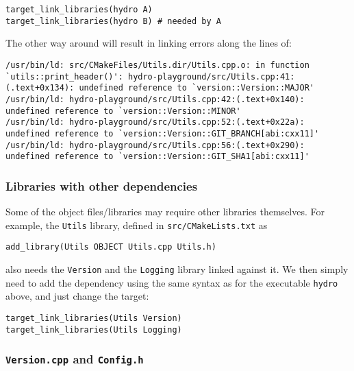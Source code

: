 \begin{lstlisting}
target_link_libraries(hydro A)
target_link_libraries(hydro B) # needed by A
\end{lstlisting}

The other way around will result in linking errors along the lines of:

\begin{lstlisting}
/usr/bin/ld: src/CMakeFiles/Utils.dir/Utils.cpp.o: in function `utils::print_header()': hydro-playground/src/Utils.cpp:41:(.text+0x134): undefined reference to `version::Version::MAJOR'
/usr/bin/ld: hydro-playground/src/Utils.cpp:42:(.text+0x140): undefined reference to `version::Version::MINOR'
/usr/bin/ld: hydro-playground/src/Utils.cpp:52:(.text+0x22a): undefined reference to `version::Version::GIT_BRANCH[abi:cxx11]'
/usr/bin/ld: hydro-playground/src/Utils.cpp:56:(.text+0x290): undefined reference to `version::Version::GIT_SHA1[abi:cxx11]'
\end{lstlisting}




\subsubsection{Libraries with other dependencies}

Some of the object files/libraries may require other libraries themselves. For
example, the \verb|Utils| library, defined in \verb|src/CMakeLists.txt| as

\begin{lstlisting}
add_library(Utils OBJECT Utils.cpp Utils.h)
\end{lstlisting}

also needs the \verb|Version| and the \verb|Logging| library linked against it.
We then simply need to add the dependency using the same syntax as for the
executable \verb|hydro| above, and just change the target:

\begin{lstlisting}
target_link_libraries(Utils Version)
target_link_libraries(Utils Logging)
\end{lstlisting}





\subsubsection{\texttt{Version.cpp} and \texttt{Config.h}}

